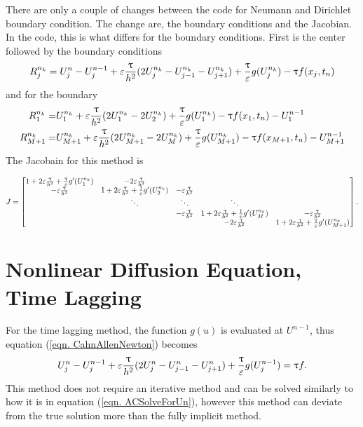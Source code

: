 There are only a couple of changes between the code for Neumann and Dirichlet boundary condition. The change are, the boundary conditions and the Jacobian. In the code, this is what differs for the boundary conditions. First is the center followed by the boundary conditions
\begin{eqnarray}
R_j^{n_k} = U^{n}_j-U^{n-1}_j + \varepsilon \frac{ {\uptau}}{h^2}(2U^{n_k}_j-U^{n_k}_{j-1}-U^{n_k}_{j+1})+\frac{{\uptau}}{\varepsilon}g(U^{n_k}_j) - {\uptau} f(x_j,t_n)
\end{eqnarray}
and for the boundary
\begin{align}
R_{1}^{n_k} =& U_1^{n_{k}}+\varepsilon \frac{{\uptau}}{h^2} (2 U_1^{n_k}-2 U_2^{n_k}) +\frac{{\uptau}}{\varepsilon} g(U_1^{n_k})-{\uptau} f(x_1,t_n)-U_1^{n-1}\\ 
R_{M+1}^{n_k} =& U_{M+1}^{n_k}+\varepsilon \frac{{\uptau}}{h^2} (2 U_{M+1}^{n_k}-2 U_{M}^{n_k})+\frac{{\uptau}}{\varepsilon} g(U_{M+1}^{n_k})-{\uptau} f(x_{M+1},t_n)-U_{M+1}^{n-1}
\end{align}
The Jacobain for this method is
\scriptsize{
\begin{center}
$ J = \begin{bmatrix}
1+2\varepsilon \frac{{\uptau}}{h^2}+\frac{{\uptau}}{\varepsilon} g'(U_1^{n_k})  & -2\varepsilon \frac{{\uptau}}{h^2} &  & & \\
-\varepsilon \frac{{\uptau}}{h^2} & 1+2 \varepsilon \frac{{\uptau}}{h^2} +\frac{1}{\varepsilon}g'(U_2^{n_k})& -\varepsilon \frac{{\uptau}}{h^2} & & \\
& \ddots & \ddots & \ddots \\
& &-\varepsilon \frac{{\uptau}}{h^2} & 1+2 \varepsilon \frac{{\uptau}}{h^2} +\frac{1}{\varepsilon}g'(U_M^{n_k})& -\varepsilon \frac{{\uptau}}{h^2}   \\
& &  &  -2\varepsilon \frac{{\uptau}}{h^2} & 1+2\varepsilon \frac{{\uptau}}{h^2}+\frac{{\uptau}}{\varepsilon} g'(U_{M+1}^{n_k}) 
\end{bmatrix}.  $
\end{center} }
\normalsize


\section{Nonlinear Diffusion Equation, Time Lagging}
%
For the time lagging method, the function $g(u)$ is evaluated at $U^{n-1}$, thus equation (\ref{eqn. CahnAllenNewton}) becomes
\begin{eqnarray} \label{eqn. CahnAllenTimeLagging}
U^{n}_j-U^{n-1}_j + \varepsilon \frac{ {\uptau}}{h^2}(2U^n_j-U^n_{j-1}-U^n_{j+1})+\frac{{\uptau}}{\varepsilon}g(U_j^{n-1} ) ={\uptau} f.
\end{eqnarray} 
This method does not require an iterative method and can be solved similarly to how it is in equation (\ref{eqn. ACSolveForUn}), however this method can deviate from the true solution more than the fully implicit method. 


